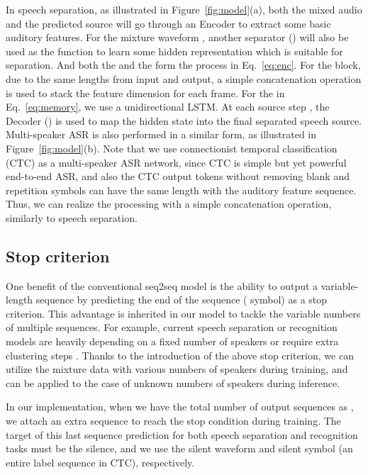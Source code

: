 \documentclass{article}
\begin{document}
In speech separation, as illustrated in Figure~\ref{fig:model}(a), both the mixed audio and the predicted source will go through an Encoder  to extract some basic auditory features. 
For the mixture waveform , another separator () will also be used as the function to learn some hidden representation which is suitable for separation. 
And both the  and the  form the process in Eq.~\ref{eq:enc}. 
For the  block, due to the same lengths from input and output, a simple concatenation operation is used to stack the feature dimension for each frame. 
For the  in Eq.~\ref{eq:memory}, we use a unidirectional LSTM.
At each source step , the Decoder () is used to map the hidden state  into the final separated speech source.
Multi-speaker ASR is also performed in a similar form, as illustrated in Figure~\ref{fig:model}(b).
Note that we use connectionist temporal classification (CTC) \cite{graves2006connectionist} as a multi-speaker ASR network, since CTC is simple but yet powerful end-to-end ASR, and also the CTC output tokens without removing blank and repetition symbols can have the same length with the auditory feature sequence.
Thus, we can realize the  processing with a simple concatenation operation, similarly to speech separation.

\subsection{Stop criterion}
One benefit of the conventional seq2seq model is the ability to output a variable-length sequence by predicting the end of the sequence ( symbol) as a stop criterion.
This advantage is inherited in our model to tackle the variable numbers of multiple sequences. 
For example, current speech separation or recognition models are heavily depending on a fixed number of speakers \cite{Kolbaek2017Multitalker} or require extra clustering steps \cite{hershey2016deep}.
Thanks to the introduction of the above stop criterion, we can utilize the mixture data with various numbers of speakers during training, and can be applied to the case of unknown numbers of speakers during inference.


In our implementation, when we have the total number of output sequences as , we attach an extra sequence to reach the stop condition during training. 
The target of this last sequence prediction for both speech separation and recognition tasks must be the silence, and we use the silent waveform and silent symbol (an entire  label sequence in CTC), respectively.
\end{document}
